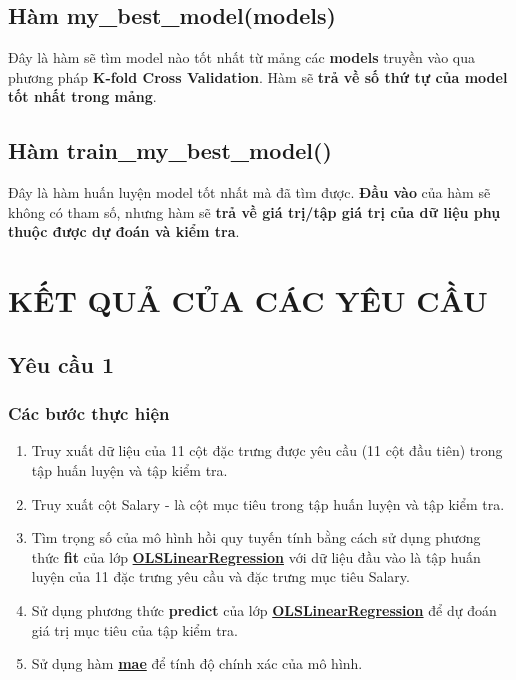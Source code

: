\documentclass{report}
\begin{document}
\subsection{Hàm my\_best\_model(models)}
    Đây là hàm sẽ tìm model nào tốt nhất từ mảng các \textbf{models} truyền vào qua phương pháp \textbf{K-fold Cross Validation}. Hàm sẽ \textbf{trả về số thứ tự của model tốt nhất trong mảng}.

\subsection{Hàm train\_my\_best\_model()}
    Đây là hàm huấn luyện model tốt nhất mà đã tìm được. \textbf{Đầu vào} của  hàm sẽ không có tham số, nhưng hàm sẽ \textbf{trả về giá trị/tập giá trị của dữ liệu phụ thuộc được dự đoán và kiểm tra}.

\section{KẾT QUẢ CỦA CÁC YÊU CẦU}
    \subsection{Yêu cầu 1}
        \subsubsection{Các bước thực hiện}
            \begin{enumerate}
                \item Truy xuất dữ liệu của 11 cột đặc trưng được yêu cầu (11 cột đầu tiên) trong tập huấn luyện và tập kiểm tra.
                \item Truy xuất cột Salary - là cột mục tiêu trong tập huấn luyện và tập kiểm tra.
                \item Tìm trọng số của mô hình hồi quy tuyến tính bằng cách sử dụng phương thức \textbf{fit} của lớp \hyperref[sec:olslinearregression]{\textbf{OLSLinearRegression}} với dữ liệu đầu vào là tập huấn luyện của 11 đặc trưng yêu cầu và đặc trưng mục tiêu Salary.
                \item Sử dụng phương thức \textbf{predict} của lớp \hyperref[sec:olslinearregression]{\textbf{OLSLinearRegression}} để dự đoán giá trị mục tiêu của tập kiểm tra.
                \item Sử dụng hàm \hyperref[sec:mae]{\textbf{mae}}  để tính độ chính xác của mô hình.
            \end{enumerate}
\end{document}
